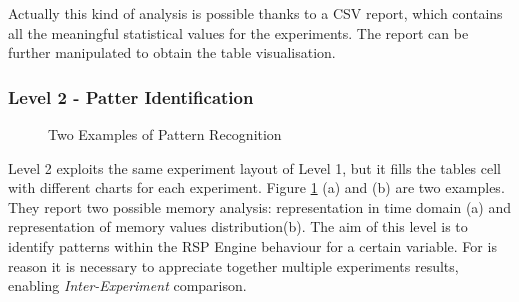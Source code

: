 Actually this kind of analysis is possible thanks to a CSV report, which contains all the meaningful statistical values for the experiments. The report can be further manipulated to obtain the table visualisation.

\subsubsection{Level 2 - Patter Identification}\label{sec:impl-level2}

\begin{figure}[tbh]
  \centering
	\caption{Two Examples of Pattern Recognition} 
  	\label{fig:pattern-examples}
\end{figure}

\noindent Level 2 exploits the same experiment layout of Level 1, but it fills the tables cell with different charts for each experiment. Figure \ref{fig:pattern-examples} (a) and (b) are two examples. They report two possible memory analysis: representation in time domain (a) and representation of memory values distribution(b). The aim of this level is to identify patterns within the RSP Engine behaviour for a certain variable. For is reason it is necessary to appreciate together multiple experiments results, enabling \textit{Inter-Experiment} comparison.

